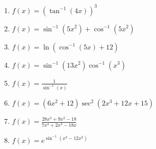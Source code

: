 \documentclass[a4paper,10pt]{article}
\begin{document}
\begin{multicols}{3}
\begin{enumerate}
\item $f(x) = (\tan^{-1}(4x))^3$
\item $f(x) = \sin^{-1}(5x^2) + \cos^{-1}(5x^2)$
\item $f(x) = \ln(\cos^{-1}(5x) + 12)$
\item $f(x) = \sin^{-1}(13x^2)\cos^{-1}(x^3)$

\item $f(x) = \frac{1}{\sin^{-1}(x)}$
\item $f(x) = (6x^2 + 12)\sec^2(2x^3 + 12x + 15)$
\item $f(x) = \frac{28x^3 + 9x^2 - 18}{7x^4 + 2x^3 - 18x}$
\item $f(x) = e^{\sin^{-1}(x^3 - 12x^2)}$
\end{enumerate}
\end{multicols}
\end{document}
